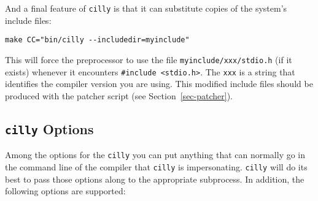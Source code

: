 \documentclass{article}
\def\secref#1{Section~\ref{sec-#1}}
\def\t#1{{\tt #1}}
\begin{document}
 And a final feature of \t{cilly} is that it can substitute copies of the
system's include files:

\begin{verbatim}
make CC="bin/cilly --includedir=myinclude"
\end{verbatim}

 This will force the preprocessor to use the file \t{myinclude/xxx/stdio.h}
(if it exists) whenever it encounters \t{#include <stdio.h>}. The \t{xxx} is
a string that identifies the compiler version you are using. This modified
include files should be produced with the patcher script (see
\secref{patcher}).

  \subsection{\t{cilly} Options}

 Among the options for the \t{cilly} you can put anything that can normally
go in the command line of the compiler that \t{cilly} is impersonating.
\t{cilly} will do its best to pass those options along to the appropriate
subprocess. In addition, the following options are supported:
\end{document}

